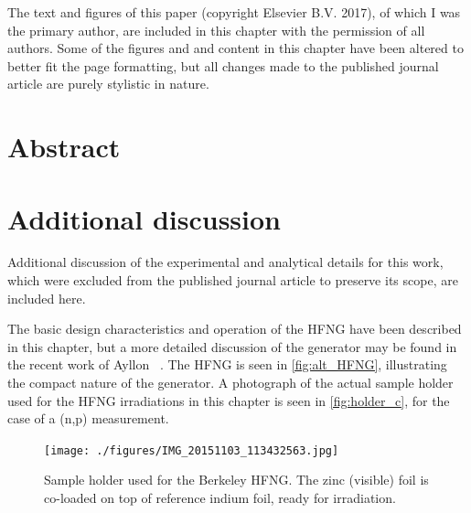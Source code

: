 \vspace{0.5cm}



The text and figures of this paper (copyright Elsevier B.V. 2017), of which I was the primary author, are
included in this chapter with the permission of all authors. 
Some of the figures and and content in this chapter have been altered to better fit the page formatting, but all changes made to the published journal article are purely stylistic in nature.


% 



% 
% 
\section{Abstract}



% 
% 




%
% 
\section{Additional discussion} \label{sec:extra_np}

Additional discussion of the experimental and analytical details for this work, which were excluded from the published journal article to preserve its scope, are included here.



The basic design characteristics and operation of the HFNG have been described in this chapter, but a more detailed discussion of the generator may be found in the recent work of Ayllon \etal\ \cite{ayllon2018design}. 
The HFNG is seen in  \autoref{fig:alt_HFNG}, illustrating the compact nature of the generator.
A photograph of the actual sample holder used for the HFNG irradiations in this chapter is seen in \autoref{fig:holder_c}, for the case of a  (n,p) measurement.


\begin{figure}
    \centering
        \texttt{[image: ./figures/IMG\_20151103\_113432563.jpg]}
        \caption{Sample holder used for the Berkeley HFNG. The zinc (visible) foil is co-loaded on top of reference indium foil, ready for irradiation.}
        \label{fig:holder_c}
\end{figure}


